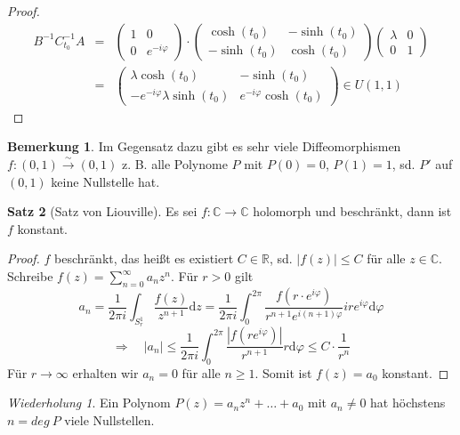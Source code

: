 \documentclass[11pt,titlepage]{article}
\theoremstyle{definition}
\newtheorem{theorem}{Satz}[section]
\newtheorem{remark}[theorem]{Bemerkung}
\theoremstyle{remark}
\newtheorem*{repetition}{Wiederholung}
\begin{document}
\begin{proof}
		\begin{eqnarray*}
			B^{-1}C_{t_0}^{-1} A &=& \begin{pmatrix}1&0\\0&e^{-i\varphi}\end{pmatrix}\cdot 
			\begin{pmatrix}\cosh(t_0)&-\sinh(t_0)\\-\sinh(t_0)&\cosh(t_0)\end{pmatrix}
			\begin{pmatrix}\lambda&0\\0&1\end{pmatrix}\\
			&=&\begin{pmatrix} \lambda \cosh(t_0)&-\sinh(t_0)\\-e^{-i\varphi}\lambda\sinh(t_0) &
			e^{-i\varphi}\cosh(t_0)\end{pmatrix}\in U(1,1)
		\end{eqnarray*}
	\end{proof}
	
	\begin{remark}
		Im Gegensatz dazu gibt es sehr viele Diffeomorphismen $f:(0,1)\overset{\sim}{\to}(0,1)$ 
		z. B. alle Polynome $P$ mit $P(0)=0$, $P(1)=1$, sd. $P'$ auf $(0,1)$ keine Nullstelle hat.
	\end{remark}
	
	\begin{theorem}[Satz von Liouville] \label{thm:LV}
		Es sei $f:\mathbb{C}\to\mathbb{C}$ holomorph und beschränkt, dann ist $f$ konstant.
	\end{theorem}
	
	\begin{proof}
		$f$ beschränkt, das heißt es existiert $C\in\mathbb{R}$, sd. $|f(z)|\leq C$ für alle 
		$z\in\mathbb{C}$. Schreibe $f(z)=\sum_{n=0}^{\infty} a_n z^n$. Für $r>0$ gilt
		\[a_n=\frac{1}{2\pi i}\int_{S_r^1}\frac{f(z)}{z^{n+1}}\mathrm{d}z =
		\frac{1}{2\pi i}\int_0^{2\pi}\frac{f(r\cdot e^{i\varphi})}{r^{n+1}e^{i(n+1)\varphi}}ire^{i\varphi}
		\mathrm{d}\varphi \]
		\[ \Rightarrow\quad |a_n|\leq \frac{1}{2\pi i}\int_0^{2\pi}\frac{|f(re^{i\varphi})|}{r^{n+1}}r 
		\mathrm{d}\varphi\leq C\cdot \frac{1}{r^n} \]
		Für $r\to\infty$ erhalten wir $a_n =0$ für alle $n\geq 1$. Somit ist $f(z)=a_0$ konstant.
	\end{proof}
	
	\begin{repetition}
		Ein Polynom $P(z)=a_n z^n+\ldots +a_0$ mit $a_n\neq 0$ hat höchstens $n=deg\ P$ viele 
		Nullstellen.
	\end{repetition}
	
\end{document}
